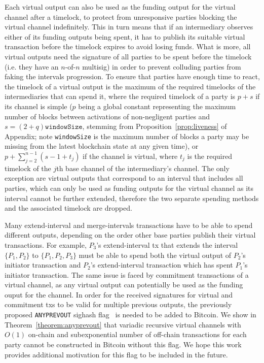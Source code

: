   Each virtual output can also be used as the funding output for the virtual
  channel after a timelock, to protect from unresponsive parties blocking the
  virtual channel indefinitely. This in turn means that if an intermediary
  observes either of its funding outputs being spent, it has to publish its
  suitable virtual transaction before the timelock expires to avoid losing
  funds. What is more, all virtual outputs need the signature of all parties to
  be spent before the timelock (i.e. they have an $n$-of-$n$ multisig) in order
  to prevent colluding parties from faking the intervals progression. To ensure
  that parties have enough time to react, the timelock of a virtual output is
  the maximum of the required timelocks of the intermediaries that can spend it,
  where the required timelock of a party is $p + s$ if its channel is simple
  ($p$ being a global constant representing the maximum number of blocks between
  activations of non-negligent parties and $s = (2 + q)\texttt{windowSize}$,
  stemming from Proposition~\ref{prop:liveness} of Appendix; note
  \texttt{windowSize} is the maximum number of blocks a party may be missing
  from the latest blockchain state at any given time),  or $p +
  \sum\limits_{j = 2}^{n - 1}(s - 1 + t_j)$ if the channel is virtual, where $t_j$ is the required timelock of the $j$th base channel
  of the intermediary's channel. The only exception are virtual outputs that
  correspond to an interval that includes all parties, which can only be used as
  funding outputs for the virtual channel as its interval cannot be further
  extended, therefore the two separate spending methods and the associated
  timelock are dropped.

  Many extend-interval and merge-intervals transactions have to be able to spend
  different outputs, depending on the order other base parties publish their
  virtual transactions. For example, $P_3$'s extend-interval tx that extends the
  interval $\{P_1, P_2\}$ to $\{P_1, P_2, P_3\}$ must be able to spend both
  the virtual output of $P_2$'s initiator transaction and $P_2$'s
  extend-interval transaction which has spent $P_1$'s initiator transaction. The
  same issue is faced by commitment transactions of a virtual channel, as any
  virtual output can potentially be used as the funding ouput for the channel.
  In order for the received signatures for virtual and commitment txs to be
  valid for multiple previous outputs, the previously proposed
  \texttt{ANYPREVOUT} sighash flag~\cite{anyprevout} is needed to be added to
  Bitcoin. We show in Theorem~\ref{theorem:anyprevout} that variadic recursive
  virtual channels with $O(1)$ on-chain and subexponential number of off-chain
  transactions for each party cannot be constructed in Bitcoin without this
  flag. We hope this work provides additional motivation for this flag to be
  included in the future.

